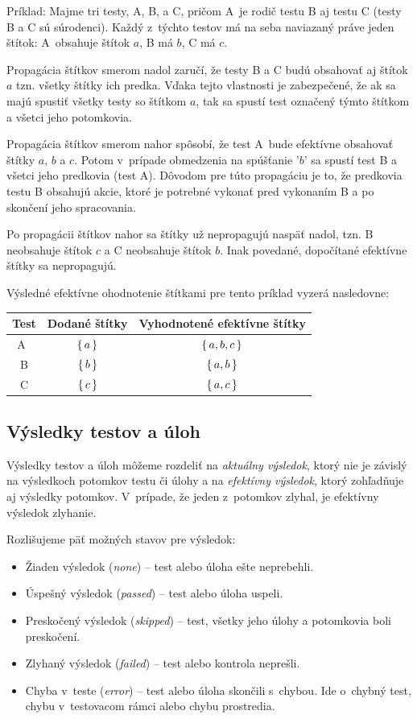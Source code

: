 \documentclass[
  digital, %
  oneside, %
  table,   %
  lof,     %
  lot,   %
]{fithesis3}
\begin{document}
Príklad: Majme tri testy, A, B, a C, pričom A~je rodič testu B aj testu C (testy B a C sú súrodenci). Každý z~týchto testov má na seba naviazaný práve jeden štítok: A~obsahuje štítok $a$, B má $b$, C má $c$. 

Propagácia štítkov smerom nadol zaručí, že testy B a C budú obsahovať aj štítok $a$ tzn. všetky štítky ich predka. Vďaka tejto vlastnosti je zabezpečené, že ak sa majú spustiť všetky testy so štítkom $a$, tak sa spustí test označený týmto štítkom a všetci jeho potomkovia.

Propagácia štítkov smerom nahor spôsobí, že test A~bude efektívne obsahovať štítky $a$, $b$ a $c$. Potom v~prípade obmedzenia na spúšťanie '$b$' sa spustí test B a všetci jeho predkovia (test A). Dôvodom pre túto propagáciu je to, že predkovia testu B obsahujú akcie, ktoré je potrebné vykonať pred vykonaním B a po skončení jeho spracovania.

Po propagácii štítkov nahor sa štítky už nepropagujú naspäť nadol, tzn. B neobsahuje štítok $c$ a C neobsahuje štítok $b$. Inak povedané, dopočítané efektívne štítky sa nepropagujú.

Výsledné efektívne ohodnotenie štítkami pre tento príklad vyzerá nasledovne:
\begin{table}[h]
\begin{tabular}{c c c}
Test & Dodané štítky & Vyhodnotené efektívne štítky  \\ [0.5ex] 
\hline
A~& $\set{a}$ & $\set{a,b,c}$ \\
B & $\set{b}$ & $\set{a,b}$   \\
C & $\set{c}$ & $\set{a,c}$   \\
\end{tabular}
\end{table}


\subsection{Výsledky testov a úloh}

Výsledky testov a úloh môžeme rozdeliť na \emph{aktuálny výsledok}, ktorý nie je závislý na výsledkoch potomkov testu či úlohy a na \emph{efektívny výsledok}, ktorý zohľadňuje aj výsledky potomkov. V~prípade, že jeden z~potomkov zlyhal, je efektívny výsledok zlyhanie.

Rozlišujeme päť možných stavov pre výsledok:
\begin{itemize}
    \item Žiaden výsledok (\emph{none}) -- test alebo úloha ešte neprebehli.
    \item Úspešný výsledok (\emph{passed}) -- test alebo úloha uspeli.
    \item Preskočený výsledok (\emph{skipped}) -- test, všetky jeho úlohy a potomkovia boli preskočení.
    \item Zlyhaný výsledok (\emph{failed}) -- test alebo kontrola neprešli.
    \item Chyba v~teste (\emph{error}) -- test alebo úloha skončili s~chybou. Ide o~chybný test, chybu v~testovacom rámci alebo chybu prostredia.
\end{itemize}
\end{document}
